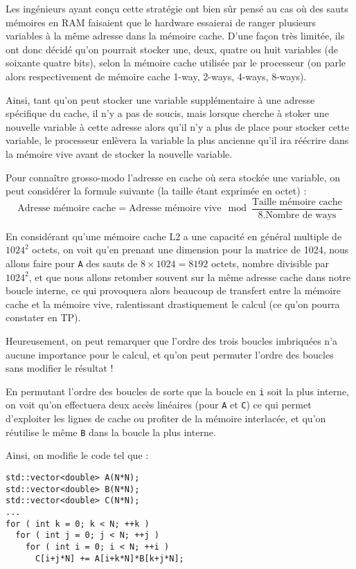 \documentclass[fleqn,11pt]{article}
\begin{document}
Les ingénieurs ayant conçu cette stratégie ont bien sûr pensé au cas où des sauts mémoires en RAM faisaient que le hardware essaierai de ranger plusieurs variables à la même adresse dans la mémoire cache. D'une façon très limitée, ils ont donc décidé qu'on pourrait stocker une, deux, quatre ou huit variables (de soixante quatre bits), selon la mémoire cache utilisée par le processeur (on parle alors respectivement de mémoire cache 1-way, 2-ways, 4-ways, 8-ways).

Ainsi, tant qu'on peut stocker une variable supplémentaire à une adresse spécifique du cache, il n'y a pas de soucis, mais lorsque cherche à stoker une nouvelle variable à cette adresse alors qu'il n'y a plus de place pour stocker cette variable, le processeur enlèvera la variable la plus ancienne qu'il ira réécrire dans la mémoire vive avant de stocker la nouvelle variable. 

Pour connaître grosso-modo l'adresse en cache où sera stockée une variable, on peut considérer la formule suivante (la taille étant exprimée en octet) :
\[
\textrm{Adresse mémoire cache} = \textrm{Adresse mémoire vive} \mod \frac{\textrm{Taille mémoire cache}}{8.\textrm{Nombre de ways}}
\]

En considérant qu'une mémoire cache L2 a une capacité en général multiple de $1024^{2}$ octets, on voit
qu'en prenant une dimension pour la matrice de 1024, nous allons faire pour \texttt{A} des sauts de
$8\times 1024 = 8192$ octets, nombre divisible par $1024^{2}$, et que nous allons retomber souvent sur la
même adresse cache dans notre boucle interne, ce qui provoquera alors beaucoup de transfert entre la mémoire cache et la mémoire vive, ralentissant drastiquement le calcul (ce qu'on pourra constater en TP).

Heureusement, on peut remarquer que l'ordre des trois boucles imbriquées n'a aucune importance pour le
calcul, et qu'on peut permuter l'ordre des boucles sans modifier le résultat !

En permutant l'ordre des boucles de sorte que la boucle en \texttt{i} soit la plus interne, on voit qu'on effectuera deux accès linéaires (pour \texttt{A} et \texttt{C}) ce qui permet d'exploiter les lignes de cache ou profiter de la mémoire interlacée, et qu'on réutilise le même \texttt{B} dans la boucle la plus interne.

Ainsi, on modifie le code tel que :

\begin{lstlisting}
std::vector<double> A(N*N);
std::vector<double> B(N*N);
std::vector<double> C(N*N);
...
for ( int k = 0; k < N; ++k )
  for ( int j = 0; j < N; ++j )
    for ( int i = 0; i < N; ++i )
      C[i+j*N] += A[i+k*N]*B[k+j*N];
\end{lstlisting}
\end{document}
